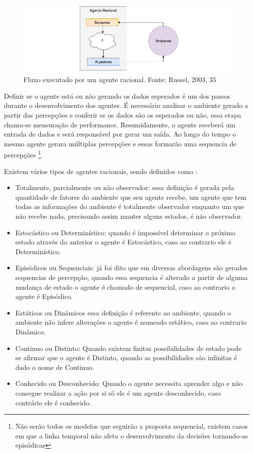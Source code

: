 \begin{figure}
    \centering
    \includegraphics[width=.8\textwidth]{imagens/rational_agent_draw.png}
    \caption{Fluxo executado por um agente racional. Fonte: Russel, 2003, 35}
    \label{fig:rational_agent_draw}
\end{figure}

Definir se o agente está ou não gerando os dados esperados é um dos passos durante o desenvolvimento dos agentes. É necessário analisar o ambiente gerado a partir das percepções e conferir se os dados são os esperados ou não, essa etapa chama-se mensuração de performance. Resumidamente, o agente receberá um entrada de dados e será responsável por gerar um saída. Ao longo do tempo o mesmo agente gerara múltiplas percepções e essas formarão uma sequencia de percepções \footnote{Não serão todos os modelos que seguirão a proposta sequencial, existem casos em que a linha temporal não afeta o desenvolvimento da decisões tornando-as episódicas}.

Existem vários tipos de agentes racionais, sendo definidos como \cite[34-45]{russell2003artificial}:

\begin{itemize}
 \item Totalmente, parcialmente ou não observador: essa definição é gerada pela quantidade de fatores do ambiente que seu agente recebe, um agente que tem todas as informações do ambiente é totalmente observador enquanto um que não recebe nada, precisando assim manter alguns estados, é não observador.
 \item Estocástico ou Determinístico: quando é impossível determinar o próximo estado através do anterior o agente é Estocástico, caso ao contrario ele é Determinístico.
 \item Episódicos ou Sequenciais: já foi dito que em diversas abordagens são gerados sequencias de percepção, quando essa sequencia é alterado a partir de alguma mudança de estado o agente é chamado de sequencial, caso ao contrario o agente é Episódico.
 \item Estáticos ou Dinâmicos essa definição é referente ao ambiente, quando o ambiente não infere alterações o agente é nomeado estático, caso ao contrario Dinâmico.
 \item Continuo ou Distinto: Quando existem finitas possibilidades de estado pode se afirmar que o agente é Distinto, quando as possibilidades são infinitas é dado o nome de Continuo.
 \item Conhecido ou Desconhecido: Quando o agente necessita aprender algo e não consegue realizar a ação por si só ele é um agente desconhecido, caso contrário ele é conhecido.
\end{itemize}

